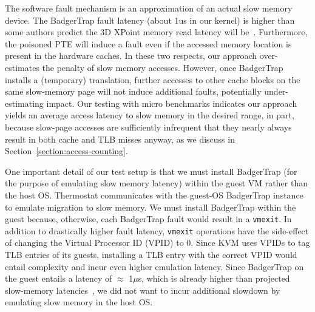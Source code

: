 The software fault mechanism is an approximation of an actual slow memory device.
The BadgerTrap fault latency (about 1us in our kernel) is higher than some authors
predict the 3D XPoint memory read latency will be~\cite{ref:Dulloor:datatiering}.  Furthermore, the poisoned PTE
will induce a fault even if the accessed memory location is present in the hardware 
caches. In these two respects, our approach over-estimates the penalty of slow 
memory accesses.  However, once BadgerTrap installs a (temporary) translation, 
further accesses to other cache blocks on the same slow-memory page will not 
induce additional faults, potentially under-estimating impact. Our testing with micro benchmarks
indicates our approach yields an average access latency to slow memory in the 
desired range, in part, because slow-page accesses are sufficiently infrequent that
they nearly always result in both cache and TLB misses anyway, as we discuss in
Section~\ref{section:access-counting}.


One important detail of our test setup is that we must install BadgerTrap (for the purpose 
of emulating slow memory latency) within
the guest VM rather than the host OS.  Thermostat communicates with the guest-OS 
BadgerTrap instance to emulate migration to slow memory.  We must install
BadgerTrap within the guest because, otherwise, each BadgerTrap fault would 
result in a {\tt vmexit}.  In addition to drastically higher fault latency, {\tt vmexit} operations
have the side-effect of changing the Virtual Processor ID (VPID) to 0. Since KVM
uses VPIDs to tag TLB entries of its guests, installing a TLB entry with the
correct VPID would entail complexity and incur even higher emulation latency.
Since BadgerTrap on the guest entails a latency of
$\approx$ 1$\mu$s, which is already higher than projected slow-memory latencies~\cite{ref:Dulloor:datatiering},
we did not want to incur additional slowdown by emulating slow memory in the
host OS.


